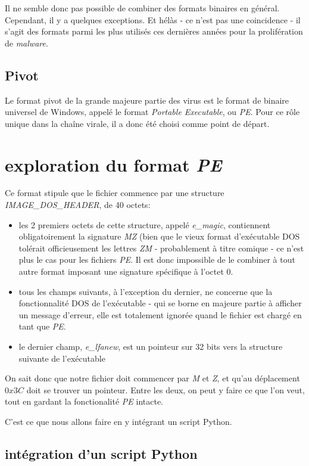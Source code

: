 Il ne semble donc pas possible de combiner des formats binaires en général. Cependant, il y a quelques exceptions. Et hélàs - ce n'est pas une coincidence - il s'agit des formats parmi les plus utilisés ces dernières années pour la prolifération de {\it malware}.

\subsection{Pivot}

Le format pivot de la grande majeure partie des virus est le format de binaire universel de Windows, appelé le format {\it Portable Executable}, ou {\em PE}. Pour ce rôle unique dans la chaîne virale, il a donc été choisi comme point de départ.

\section{exploration du format {\em PE}}
Ce format stipule que le fichier commence par une structure {\em IMAGE\_DOS\_HEADER}, de 40 octets:
\begin{itemize}
\item les 2 premiers octets de cette structure, appelé {\em e\_magic}, contiennent obligatoirement la signature {\em MZ} (bien que le vieux format d'exécutable DOS tolérait officieusement les lettres {\em ZM} - probablement à titre comique - ce n'est plus le cas pour les fichiers {\em PE}. Il est donc impossible de le combiner à tout autre format imposant une signature spécifique à l'octet 0.
\item tous les champs suivants, à l'exception du dernier, ne concerne que la fonctionnalité DOS de l'exécutable - qui se borne en majeure partie à afficher un message d'erreur, elle est totalement ignorée quand le fichier est chargé en tant que {\em PE}.
\item le dernier champ, {\em e\_lfanew}, est un pointeur sur 32 bits vers la structure suivante de l'exécutable
\end{itemize}

On sait donc que notre fichier doit commencer par {\em M} et {\em Z}, et qu'au déplacement $0x3C$ doit se trouver un pointeur. Entre les deux, on peut y faire ce que l'on veut, tout en gardant la fonctionalité {\em PE} intacte.

C'est ce que nous allons faire en y intégrant un script Python.

\subsection{intégration d'un script Python}


